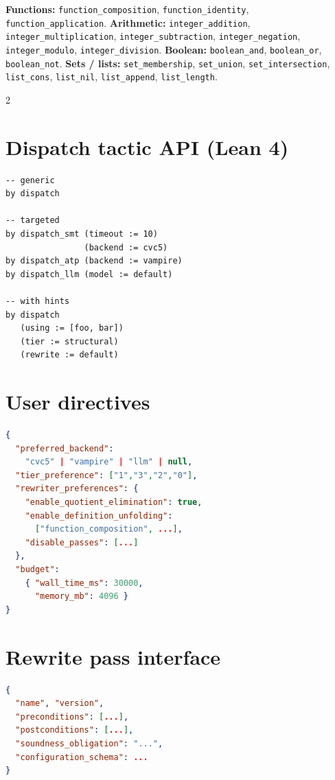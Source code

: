 \documentclass[10pt,letterpaper]{article}
\begin{document}
\noindent
\textbf{Functions:} \texttt{function\_composition},
\texttt{function\_identity}, \texttt{function\_application}.
\quad
\textbf{Arithmetic:} \texttt{integer\_addition},
\texttt{integer\_multiplication}, \texttt{integer\_subtraction},
\texttt{integer\_negation}, \texttt{integer\_modulo},
\texttt{integer\_division}.
\quad
\textbf{Boolean:} \texttt{boolean\_and},
\texttt{boolean\_or}, \texttt{boolean\_not}.
\quad
\textbf{Sets / lists:} \texttt{set\_membership},
\texttt{set\_union}, \texttt{set\_intersection},
\texttt{list\_cons}, \texttt{list\_nil},
\texttt{list\_append}, \texttt{list\_length}.

\begin{multicols}{2}

\section{Dispatch tactic API (Lean 4)}

\begin{lstlisting}[style=plain]
-- generic
by dispatch

-- targeted
by dispatch_smt (timeout := 10)
                (backend := cvc5)
by dispatch_atp (backend := vampire)
by dispatch_llm (model := default)

-- with hints
by dispatch
   (using := [foo, bar])
   (tier := structural)
   (rewrite := default)
\end{lstlisting}

\section{User directives}

\begin{lstlisting}[language=json]
{
  "preferred_backend":
    "cvc5" | "vampire" | "llm" | null,
  "tier_preference": ["1","3","2","0"],
  "rewriter_preferences": {
    "enable_quotient_elimination": true,
    "enable_definition_unfolding":
      ["function_composition", ...],
    "disable_passes": [...]
  },
  "budget":
    { "wall_time_ms": 30000,
      "memory_mb": 4096 }
}
\end{lstlisting}

\section{Rewrite pass interface}

\begin{lstlisting}[language=json]
{
  "name", "version",
  "preconditions": [...],
  "postconditions": [...],
  "soundness_obligation": "...",
  "configuration_schema": ...
}
\end{lstlisting}


\end{multicols}
\end{document}

